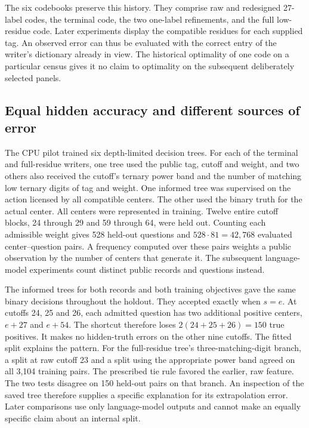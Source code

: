\documentclass[12pt,letterpaper]{article}
\begin{document}
The six codebooks preserve this history. They comprise raw and redesigned 27-label codes, the terminal code, the two one-label refinements, and the full low-residue code. Later experiments display the compatible residues for each supplied tag. An observed error can thus be evaluated with the correct entry of the writer's dictionary already in view. The historical optimality of one code on a particular census gives it no claim to optimality on the subsequent deliberately selected panels.

\subsection{Equal hidden accuracy and different sources of error}

The CPU pilot trained six depth-limited decision trees. For each of the terminal and full-residue writers, one tree used the public tag, cutoff and weight, and two others also received the cutoff's ternary power band and the number of matching low ternary digits of tag and weight. One informed tree was supervised on the action licensed by all compatible centers. The other used the binary truth for the actual center. All centers were represented in training. Twelve entire cutoff blocks, 24 through 29 and 59 through 64, were held out. Counting each admissible weight gives 528 held-out questions and \(528\cdot81=42{,}768\) evaluated center--question pairs. A frequency computed over these pairs weights a public observation by the number of centers that generate it. The subsequent language-model experiments count distinct public records and questions instead.

The informed trees for both records and both training objectives gave the same binary decisions throughout the holdout. They accepted exactly when \(s=e\). At cutoffs 24, 25 and 26, each admitted question has two additional positive centers, \(e+27\) and \(e+54\). The shortcut therefore loses \(2(24+25+26)=150\) true positives. It makes no hidden-truth errors on the other nine cutoffs. The fitted split explains the pattern. For the full-residue tree's three-matching-digit branch, a split at raw cutoff 23 and a split using the appropriate power band agreed on all 3,104 training pairs. The prescribed tie rule favored the earlier, raw feature. The two tests disagree on 150 held-out pairs on that branch. An inspection of the saved tree therefore supplies a specific explanation for its extrapolation error. Later comparisons use only language-model outputs and cannot make an equally specific claim about an internal split.
\end{document}
